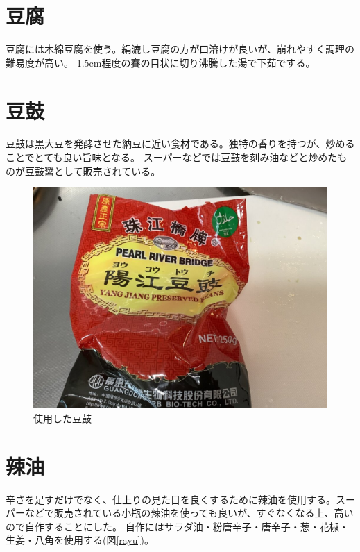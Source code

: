 \documentclass[a4paper,10pt,xelatex,ja=standard,twocolumn]{bxjsarticle}
\begin{document}
\section{豆腐}

豆腐には木綿豆腐を使う。絹漉し豆腐の方が口溶けが良いが、崩れやすく調理の難易度が高い。
1.5cm程度の賽の目状に切り沸騰した湯で下茹でする。

\section{豆鼓}

豆鼓は黒大豆を発酵させた納豆に近い食材である。独特の香りを持つが、炒めることでとても良い旨味となる。
スーパーなどでは豆鼓を刻み油などと炒めたものが豆鼓醤として販売されている。

\begin{figure}[h]
  \caption{使用した豆鼓}
  \label{tochi}
  \begin{center}
    \includegraphics[width=\linewidth]{IMG_4091.jpg}
  \end{center}
\end{figure}

\section{辣油}

辛さを足すだけでなく、仕上りの見た目を良くするために辣油を使用する。スーパーなどで販売されている小瓶の辣油を使っても良いが、すぐなくなる上、高いので自作することにした\cite{3}。
自作にはサラダ油・粉唐辛子・唐辛子・葱・花椒・生姜・八角を使用する(図\ref{rayu})。
\end{document}
